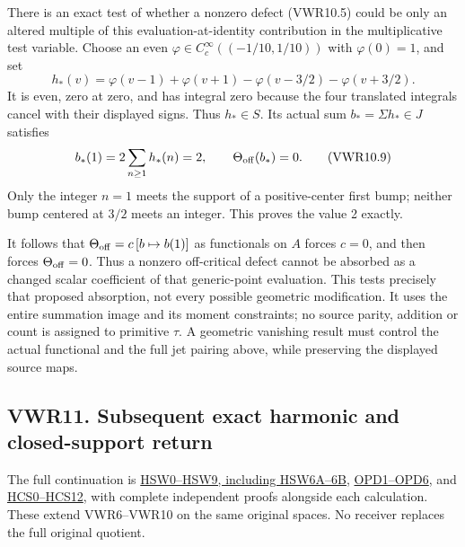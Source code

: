 There is an exact test of whether a nonzero defect (VWR10.5) could be
only an altered multiple of this evaluation-at-identity contribution in
the multiplicative test variable. Choose an even
\(\varphi\in C_c^\infty((-1/10,1/10))\) with \(\varphi(0)=1\), and set
\[
h_*(v)=\varphi(v-1)+\varphi(v+1)
 -\varphi(v-3/2)-\varphi(v+3/2).
\tag{VWR10.8}
\] It is even, zero at zero, and has integral zero because the four
translated integrals cancel with their displayed signs. Thus
\(h_*\in S\). Its actual sum \(b_* =\Sigma h_*\in J\) satisfies \[
b_*(1)=2\sum_{n\ge1}h_*(n)=2,
\qquad \Theta_{\rm off}(b_*)=0.
\tag{VWR10.9}
\] Only the integer \(n=1\) meets the support of a positive-center first
bump; neither bump centered at \(3/2\) meets an integer. This proves the
value 2 exactly.

It follows that \(\Theta_{\rm off}=c\,[b\mapsto b(1)]\) as functionals
on \(A\) forces \(c=0\), and then forces \(\Theta_{\rm off}=0\). Thus a
nonzero off-critical defect cannot be absorbed as a changed scalar
coefficient of that generic-point evaluation. This tests precisely that
proposed absorption, not every possible geometric modification. It uses
the entire summation image and its moment constraints; no source parity,
addition or count is assigned to primitive \(\tau\). A geometric
vanishing result must control the actual functional and the full jet
pairing above, while preserving the displayed source maps.

\subsection{VWR11. Subsequent exact harmonic and closed-support
return}\label{vwr11.-subsequent-exact-harmonic-and-closed-support-return}

The full continuation is
\href{https://github.com/KokunoYumeto/zeta-function-research-reader/blob/main/workbenches/splitzero-tandem/continuations/20260925-full-source-tensor-and-original-divisor/counterfactual/ORIGINAL_ZETA_HARMONIC_SWEEP_AND_OFFCRITICAL_DEFECT.md}{HSW0--HSW9,
including HSW6A--6B},
\href{https://github.com/KokunoYumeto/zeta-function-research-reader/blob/main/workbenches/splitzero-tandem/continuations/20260925-full-source-tensor-and-original-divisor/counterfactual/ORIGINAL_PRIME_DILATION_FORCING_IDENTITY.md}{OPD1--OPD6},
and
\href{https://github.com/KokunoYumeto/zeta-function-research-reader/blob/main/workbenches/splitzero-tandem/continuations/20260925-full-source-tensor-and-original-divisor/counterfactual/HILBERT_CLOSURE_CLOSED_SUPPORT_AND_RESTRICTION.md}{HCS0--HCS12},
with complete independent proofs alongside each calculation. These
extend VWR6--VWR10 on the same original spaces. No receiver replaces the
full original quotient.

